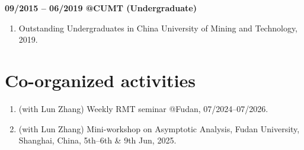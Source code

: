 \documentclass[margin]{res}
\begin{document}
\begin{resume}
\textbf{09/2015 -- 06/2019 @CUMT (Undergraduate)}
\begin{enumerate}[--]
    \item Outstanding Undergraduates in China University of Mining and Technology, 2019.
\end{enumerate}


\section{Co-organized activities}
\begin{enumerate}[--]
    \item (with Lun Zhang) Weekly RMT seminar @Fudan, 07/2024--07/2026.
    \item (with Lun Zhang) Mini-workshop on Asymptotic Analysis, Fudan University, Shanghai, China, 5th--6th \& 9th Jun, 2025.
\end{enumerate}


\end{resume}
\end{document}
